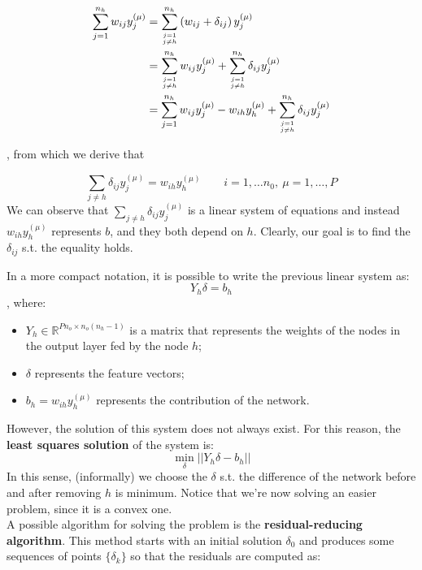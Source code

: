 \begin{equation*}
\begin{split}
\sum_{j=1}^{n_{h}} w_{ij} y_{j}^{(\mu)} &= \sum_{j=1 \atop j\neq h}^{n_{h}} \left( w_{ij} + \delta_{ij} \right) y_{j}^{ (\mu)} \\
& = \sum_{j=1 \atop j\neq h}^{n_{h}} w_{ij}y_{j}^{ (\mu)} + \sum_{j=1 \atop j\neq h}^{n_{h}}\delta_{ij}  y_{j}^{ (\mu)} \\
&=  \sum_{j=1}^{n_{h}} w_{ij}y_{j}^{ (\mu)} - w_{ih}y_h^{(\mu)} + \sum_{j=1 \atop j\neq h}^{n_{h}}\delta_{ij}  y_{j}^{ (\mu)}
\end{split}
\end{equation*}

, from which we derive that

$$\sum_{j \neq h} \delta_{ij} y_{j}^{(\mu)} = w_{ih} y_{h}^{(\mu)} \qquad i=1, \dots n_0, ~ \mu=1,\dots, P$$
We can observe that $\sum_{j \neq h} \delta_{ij} y_{j}^{(\mu)}$ is a linear system of equations and instead $w_{ih} y_{h}^{(\mu)}$ represents $b$, and they both depend on $h$. Clearly, our goal is to find the $\delta_{ij}$ s.t. the equality holds.

In a more compact notation, it is possible to write the previous linear system as:
$$Y_h \delta = b_h$$
, where:

\begin{itemize}
    \item $Y_h \in \mathbb { R } ^ { P n _ { o } \times n _ { o } \left( n _ { h } - 1 \right) }$ is a matrix that represents the weights of the nodes in the output layer fed by the node $h$;
    \item $\delta$ represents the feature vectors;
    \item $b_h = w_{ih} y_{h}^{(\mu)}$ represents the contribution of the network.
\end{itemize}

However, the solution of this system does not always exist. For this reason, the \textbf{least squares solution} of the system is:
$$\min_{\delta} || Y_h \delta - b_h ||$$
In this sense, (informally) we choose the $\delta$ s.t. the difference of the network before and after removing $h$ is minimum. Notice that we're now solving an easier problem, since it is a convex one.\\
A possible algorithm for solving the problem is the \textbf{residual-reducing algorithm}. This method starts with an initial solution $\delta_0$ and produces some sequences of points $\{\delta_k\}$ so that the residuals are computed as:

